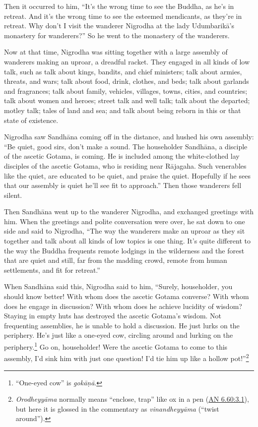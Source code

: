 \documentclass[12pt,openany]{book}%
\begin{document}
Then it occurred to him, “It’s the wrong time to see the Buddha, as he’s in retreat. And it’s the wrong time to see the esteemed mendicants, as they’re in retreat. Why don’t I visit the wanderer Nigrodha at the lady \textsanskrit{Udumbarikā}’s monastery for wanderers?” So he went to the monastery of the wanderers. 

Now at that time, Nigrodha was sitting together with a large assembly of wanderers making an uproar, a dreadful racket. They engaged in all kinds of low talk, such as talk about kings, bandits, and chief ministers; talk about armies, threats, and wars; talk about food, drink, clothes, and beds; talk about garlands and fragrances; talk about family, vehicles, villages, towns, cities, and countries; talk about women and heroes; street talk and well talk; talk about the departed; motley talk; tales of land and sea; and talk about being reborn in this or that state of existence. 

Nigrodha saw \textsanskrit{Sandhāna} coming off in the distance, and hushed his own assembly: “Be quiet, good sirs, don’t make a sound. The householder \textsanskrit{Sandhāna}, a disciple of the ascetic Gotama, is coming. He is included among the white-clothed lay disciples of the ascetic Gotama, who is residing near \textsanskrit{Rājagaha}. Such venerables like the quiet, are educated to be quiet, and praise the quiet. Hopefully if he sees that our assembly is quiet he’ll see fit to approach.” Then those wanderers fell silent. 

Then \textsanskrit{Sandhāna} went up to the wanderer Nigrodha, and exchanged greetings with him. When the greetings and polite conversation were over, he sat down to one side and said to Nigrodha, “The way the wanderers make an uproar as they sit together and talk about all kinds of low topics is one thing. It’s quite different to the way the Buddha frequents remote lodgings in the wilderness and the forest that are quiet and still, far from the madding crowd, remote from human settlements, and fit for retreat.” 

When \textsanskrit{Sandhāna} said this, Nigrodha said to him, “Surely, householder, you should know better! With whom does the ascetic Gotama converse? With whom does he engage in discussion? With whom does he achieve lucidity of wisdom? Staying in empty huts has destroyed the ascetic Gotama’s wisdom. Not frequenting assemblies, he is unable to hold a discussion. He just lurks on the periphery. He’s just like a one-eyed cow, circling around and lurking on the periphery.\footnote{“One-eyed cow” is \textit{\textsanskrit{gokāṇā}}. } Go on, householder! Were the ascetic Gotama to come to this assembly, I’d sink him with just one question! I’d tie him up like a hollow pot!”\footnote{\textit{\textsanskrit{Orodheyyāma}} normally means “enclose, trap” like ox in a pen (\href{https://suttacentral.net/an6.60/en/sujato\#3.1}{AN 6.60:3.1}), but here it is glossed in the commentary as \textit{\textsanskrit{vinandheyyāma}} (“twist around”). } 
\end{document}
